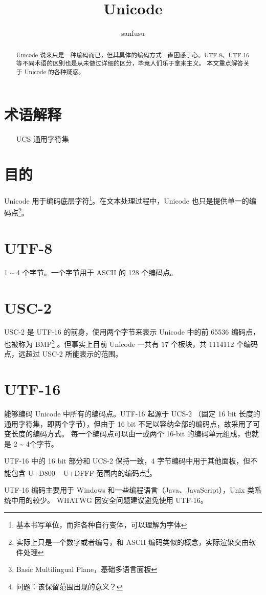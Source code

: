 \documentclass[UTF8]{ctexart}
\begin{document}
	\title{Unicode}
	\author{sanfusu}
	\maketitle
	
	\begin{abstract}
		Unicode 说来只是一种编码而已，但其具体的编码方式一直困惑于心。UTF-8、UTF-16 等不同术语的区别也是从未做过详细的区分，毕竟人们乐于拿来主义。
		本文重点解答关于 Unicode 的各种疑惑。
	\end{abstract}
	
	\section{术语解释}
	\begin{itemize}
		\item [UCS]{通用字符集}

	\end{itemize}

	\section{目的}
	Unicode 用于编码底层字符\footnote{基本书写单位，而非各种自行变体，可以理解为字体}。在文本处理过程中，Unicode 也只是提供单一的编码点\footnote{实际上只是一个数字或者编号，和 ASCII 编码类似的概念，实际渲染交由软件处理}。

	\section{UTF-8}
	1 \textasciitilde{} 4 个字节。一个字节用于 ASCII 的 128 个编码点。
	
	\section{USC-2}
	USC-2 是 UTF-16 的前身，使用两个字节来表示 Unicode 中的前 65536 编码点，也被称为 BMP\footnote{Basic Multilingual Plane，基础多语言面板} 。但事实上目前 Unicode 一共有 17 个板块，共 1114112 个编码点，远超过 USC-2 所能表示的范围。
		
	\section{UTF-16}
	能够编码 Unicode 中所有的编码点。UTF-16 起源于 UCS-2 （固定 16 bit 长度的通用字符集，即两个字节），但由于 16 bit 不足以容纳全部的编码点，故采用了可变长度的编码方式。	
	每一个编码点可以由一或两个 16-bit 的编码单元组成，也就是 2 \~{} 4个字节。
	
	UTF-16 中的 16 bit 部分和 UCS-2 保持一致，4 字节编码中用于其他面板，但不能包含 U+D800 -- U+DFFF 范围内的编码点\footnote{问题：该保留范围出现的意义？}。
	
	UTF-16 编码主要用于 Windows 和一些编程语言（Java、JavaScript），Unix 类系统中用的较少。
	WHATWG 因安全问题建议避免使用 UTF-16。
	

	
	
	
\end{document}
